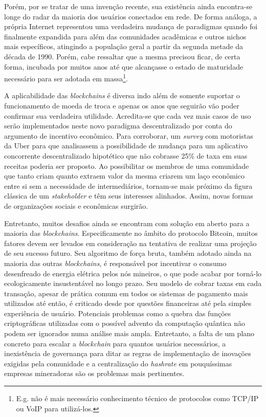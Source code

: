 \documentclass[a4paper,12pt]{monografia}
\theoremstyle{plain}
\theoremstyle{definition}
\theoremstyle{remark}
\begin{document}
Por\'{e}m, por se tratar de uma inven\c{c}\~{a}o recente, sua exist\^{e}ncia ainda encontra-se longe do radar da maioria dos usu\'{a}rios conectados em rede.
De forma an\'{a}loga, a pr\'{o}pria Internet representou uma verdadeira mudan\c{c}a de paradigmas quando foi finalmente expandida para al\'{e}m das comunidades acad\^{e}micas e outros nichos mais espec\'{i}ficos, atingindo a popula\c{c}\~{a}o geral a partir da segunda metade da d\'{e}cada de 1990.
Por\'{e}m, cabe ressaltar que a mesma precisou ficar, de certa forma, incubada por muitos anos at\'{e} que alcan\c{c}asse o estado de maturidade necess\'{a}rio para ser adotada em massa\footnote{E.g. n\~ao \'e mais necess\'ario conhecimento t\'ecnico de protocolos como TCP/IP ou VoIP para utiliz\'a-los.}.

A aplicabilidade das \textit{blockchains} \'{e} diversa indo al\'{e}m de somente suportar o funcionamento de moeda de troca e apenas os anos que seguir\~{a}o v\~{a}o poder confirmar sua verdadeira utilidade.
Acredita-se que cada vez mais casos de uso ser\~{a}o implementados neste novo paradigma descentralizado por conta do argumento de incentivo econ\^{o}mico.
Para corroborar, um \textit{survey} com motoristas da Uber para que analisassem a possibilidade de mudan\c{c}a para um aplicativo concorrente descentralizado hipot\'{e}tico que n\~{a}o cobrasse 25\% de taxa em suas receitas poderia ser proposto.
Ao possibilitar os membros de uma comunidade que tanto criam quanto extraem valor da mesma criarem um la\c{c}o econ\^{o}mico entre si sem a necessidade de intermedi\'{a}rios, tornam-se mais pr\'{o}ximo da figura cl\'{a}ssica de um \textit{stakeholder} e t\^{e}m seus interesses alinhados.
Assim, novas formas de organiza\c{c}\~{o}es sociais e econ\^{o}micas surgir\~{a}o.

Entretanto, muitos desafios ainda se encontram com solu\c{c}\~{a}o em aberto para a maioria das \textit{blockchains}.
Especificamente no \^{a}mbito do protocolo Bitcoin, muitos fatores devem ser levados em considera\c{c}\~{a}o na tentativa de realizar uma proje\c{c}\~{a}o de seu sucesso futuro.
Seu algoritmo de for\c{c}a bruta, tamb\'{e}m adotado ainda na maioria das outras \textit{blockchains}, \'{e} respons\'{a}vel por incentivar o consumo desenfreado de energia el\'{e}trica pelos n\'{o}s mineiros, o que pode acabar por torn\'{a}-lo ecologicamente insustent\'{a}vel no longo prazo.
Seu modelo de cobrar taxas em cada transa\c{c}\~{a}o, apesar de pr\'{a}tica comum em todos os sistemas de pagamento mais utilizados at\'{e} ent\~{a}o, \'e criticado desde por quest\~oes financeiras at\'e pela simples experi\^encia de usu\'ario.
Potenciais problemas como a quebra das fun\c{c}\~{o}es criptogr\'{a}ficas utilizadas com o poss\'{i}vel advento da computa\c{c}\~{a}o qu\^{a}ntica n\~{a}o podem ser ignorados numa an\'{a}lise mais ampla.
Entretanto, a falta de um plano concreto para escalar a \textit{blockchain} para quantos usu\'{a}rios necess\'{a}rios, a inexist\^{e}ncia de governan\c{c}a para ditar as regras de implementa\c{c}\~{a}o de inova\c{c}\~{o}es exigidas pela comunidade e a centraliza\c{c}\~{a}o do \textit{hashrate} em pouqu\'{i}ssimas empresas mineradoras s\~{a}o os problemas mais pertinentes.

\singlespacing


\end{document}
